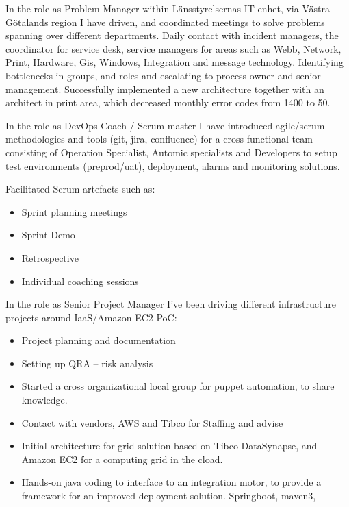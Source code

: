 \documentclass[11pt,a4paper,sans]{moderncv}        %
\begin{document}

In the role as Problem Manager within Länsstyrelsernas IT-enhet, via Västra Götalands region I have driven, and coordinated meetings to solve problems spanning over different departments. Daily contact with incident managers, the coordinator for service desk, service managers for areas such as Webb, Network, Print, Hardware, Gis, Windows, Integration and message technology. Identifying bottlenecks in groups, and roles and escalating to process owner and senior management. Successfully implemented a new architecture together with an architect in print area, which decreased monthly error codes from 1400 to 50.  

In the role as DevOps Coach / Scrum master I have introduced agile/scrum methodologies and tools (git, jira, confluence) for a cross-functional team consisting of Operation Specialist, Automic specialists and Developers to setup test environments (preprod/uat), deployment, alarms and monitoring solutions. 

Facilitated Scrum artefacts such as: 
\begin{itemize}
    \item Sprint planning meetings 
    \item Sprint Demo 
    \item Retrospective 
    \item Individual coaching sessions 
\end{itemize}

In the role as Senior Project Manager I’ve been driving different infrastructure projects around IaaS/Amazon EC2 PoC: 
\begin{itemize}
    \item Project planning and documentation 
    \item Setting up QRA – risk analysis  
    \item Started a cross organizational local group for puppet automation, to share knowledge.
    \item Contact with vendors, AWS and Tibco for Staffing and advise 
    \item Initial architecture for grid solution based on Tibco DataSynapse, and Amazon EC2 for a computing grid in the cload. 
    \item Hands-on java coding to interface to an integration motor, to provide a framework for an improved deployment solution. Springboot, maven3,  
\end{itemize}
\end{document}
